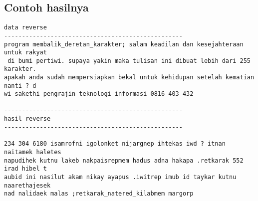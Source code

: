 \documentclass[a4paper,10pt,makeidx]{article}
\begin{document}
\subsection{Contoh hasilnya}
\begin{verbatim}
data reverse
--------------------------------------------------
program membalik_deretan_karakter; salam keadilan dan kesejahteraan untuk rakyat
 di bumi pertiwi. supaya yakin maka tulisan ini dibuat lebih dari 255 karakter.
apakah anda sudah mempersiapkan bekal untuk kehidupan setelah kematian nanti ? d
wi sakethi pengrajin teknologi informasi 0816 403 432

--------------------------------------------------
hasil reverse
--------------------------------------------------

234 304 6180 isamrofni igolonket nijargnep ihtekas iwd ? itnan naitamek haletes
napudihek kutnu lakeb nakpaisrepmem hadus adna hakapa .retkarak 552 irad hibel t
aubid ini nasilut akam nikay ayapus .iwitrep imub id taykar kutnu naarethajesek
nad nalidaek malas ;retkarak_natered_kilabmem margorp
\end{verbatim}
\end{document}
